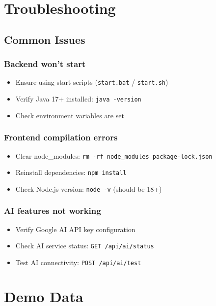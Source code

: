 \documentclass[11pt,a4paper]{article}
\begin{document}
\section{Troubleshooting}

\subsection{Common Issues}

\subsubsection{Backend won't start}
\begin{itemize}[leftmargin=*]
    \item Ensure using start scripts (\texttt{start.bat} / \texttt{start.sh})
    \item Verify Java 17+ installed: \texttt{java -version}
    \item Check environment variables are set
\end{itemize}

\subsubsection{Frontend compilation errors}
\begin{itemize}[leftmargin=*]
    \item Clear node\_modules: \texttt{rm -rf node\_modules package-lock.json}
    \item Reinstall dependencies: \texttt{npm install}
    \item Check Node.js version: \texttt{node -v} (should be 18+)
\end{itemize}

\subsubsection{AI features not working}
\begin{itemize}[leftmargin=*]
    \item Verify Google AI API key configuration
    \item Check AI service status: \texttt{GET /api/ai/status}
    \item Test AI connectivity: \texttt{POST /api/ai/test}
\end{itemize}

\section{Demo Data}
\end{document}
